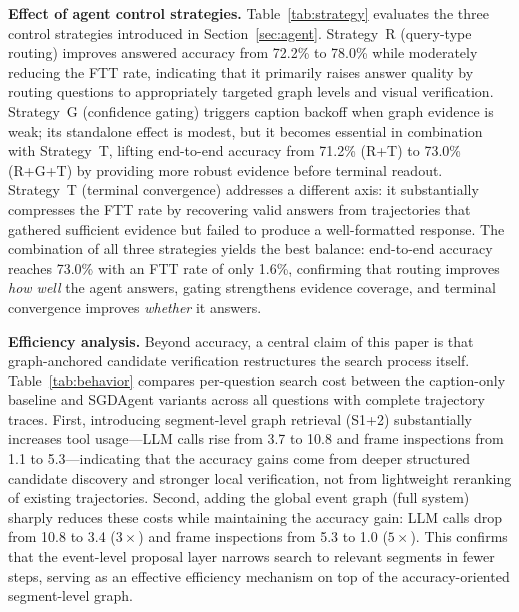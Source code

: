 \documentclass[sigconf, screen, review, anonymous]{acmart}
\begin{document}
\textbf{Effect of agent control strategies.}
Table~\ref{tab:strategy} evaluates the three control strategies
introduced in Section~\ref{sec:agent}.  Strategy~R (query-type routing)
improves answered accuracy from 72.2\% to 78.0\% while moderately
reducing the FTT rate, indicating that it primarily raises answer
quality by routing questions to appropriately targeted graph levels
and visual verification.  Strategy~G (confidence gating) triggers
caption backoff when graph evidence is weak; its standalone effect is
modest, but it becomes essential in combination with Strategy~T,
lifting end-to-end accuracy from 71.2\% (R+T) to 73.0\% (R+G+T) by
providing more robust evidence before terminal readout.
Strategy~T (terminal convergence) addresses a different axis: it
substantially compresses the FTT rate by recovering valid answers from
trajectories that gathered sufficient evidence but failed to produce a
well-formatted response.  The combination of all three strategies
yields the best balance: end-to-end accuracy reaches 73.0\% with an
FTT rate of only 1.6\%, confirming that routing improves \emph{how
well} the agent answers, gating strengthens evidence coverage, and
terminal convergence improves \emph{whether} it answers.


\textbf{Efficiency analysis.}
Beyond accuracy, a central claim of this paper is that graph-anchored
candidate verification restructures the search process itself.
Table~\ref{tab:behavior} compares per-question search cost between the
caption-only baseline and SGDAgent variants across all questions with
complete trajectory traces. First, introducing segment-level graph retrieval
(S1+2) substantially increases tool usage---LLM calls rise from 3.7 to
10.8 and frame inspections from 1.1 to 5.3---indicating that the
accuracy gains come from deeper structured candidate discovery and
stronger local verification, not from lightweight reranking of existing
trajectories.  Second, adding the global event graph (full system) sharply reduces
these costs while maintaining the accuracy gain: LLM calls drop from
10.8 to 3.4 ($3\times$) and frame inspections from 5.3 to 1.0
($5\times$).  This confirms that the
event-level proposal layer narrows search to relevant segments in fewer
steps, serving as an effective efficiency mechanism on top of the
accuracy-oriented segment-level graph.
\end{document}
